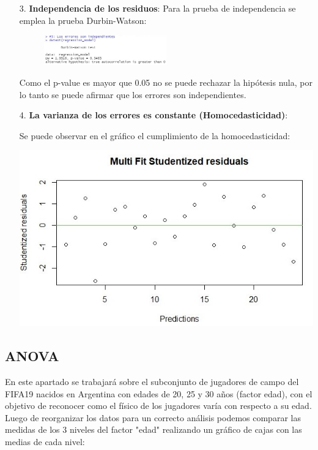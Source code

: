 \documentclass[a4paper,10pt,twocolumn]{article}
\begin{document}
\begin{enumerate}
	\item [3.] \textbf{Independencia de los residuos}:
	Para la prueba de independencia se emplea la prueba Durbin-Watson:
	
	\begin{figure}[h]
		\includegraphics[width=0.5\textwidth]{./imgs/reg_3.jpg}
	\end{figure}
	
	Como el p-value es mayor que 0.05 no se puede rechazar la hipótesis nula, por lo tanto se puede afirmar que los errores son independientes. 
	
	\item[4.] \textbf{La varianza de los errores es constante (Homocedasticidad)}:
	
	Se puede observar en el gráfico el cumplimiento de la homocedasticidad:
	
	
	\includegraphics[scale=0.5]{./imgs/reg_4.jpg}

	
\end{enumerate}

\subsection*{ANOVA}

En este apartado se trabajará sobre el subconjunto de jugadores de campo del FIFA19 nacidos en Argentina con edades de 20, 25 y 30 años (factor edad), con el objetivo de reconocer como el físico de los jugadores varía con respecto a su edad.\\
Luego de reorganizar los datos para un correcto análisis podemos comparar las medidas de los 3 niveles del factor "edad" realizando un gráfico de cajas con las medias de cada nivel:
\end{document}
